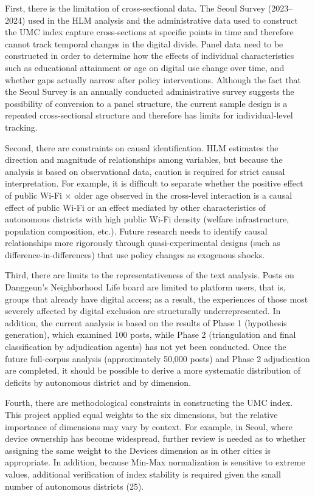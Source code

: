 First, there is the limitation of cross-sectional data. The Seoul Survey (2023--2024) used in the HLM analysis and the administrative data used to construct the UMC index capture cross-sections at specific points in time and therefore cannot track temporal changes in the digital divide. Panel data need to be constructed in order to determine how the effects of individual characteristics such as educational attainment or age on digital use change over time, and whether gaps actually narrow after policy interventions. Although the fact that the Seoul Survey is an annually conducted administrative survey suggests the possibility of conversion to a panel structure, the current sample design is a repeated cross-sectional structure and therefore has limits for individual-level tracking.

Second, there are constraints on causal identification. HLM estimates the direction and magnitude of relationships among variables, but because the analysis is based on observational data, caution is required for strict causal interpretation. For example, it is difficult to separate whether the positive effect of public Wi-Fi $\times$ older age observed in the cross-level interaction is a causal effect of public Wi-Fi or an effect mediated by other characteristics of autonomous districts with high public Wi-Fi density (welfare infrastructure, population composition, etc.). Future research needs to identify causal relationships more rigorously through quasi-experimental designs (such as difference-in-differences) that use policy changes as exogenous shocks.

Third, there are limits to the representativeness of the text analysis. Posts on Danggeun's Neighborhood Life board are limited to platform users, that is, groups that already have digital access; as a result, the experiences of those most severely affected by digital exclusion are structurally underrepresented. In addition, the current analysis is based on the results of Phase 1 (hypothesis generation), which examined 100 posts, while Phase 2 (triangulation and final classification by adjudication agents) has not yet been conducted. Once the future full-corpus analysis (approximately 50{,}000 posts) and Phase 2 adjudication are completed, it should be possible to derive a more systematic distribution of deficits by autonomous district and by dimension.

Fourth, there are methodological constraints in constructing the UMC index. This project applied equal weights to the six dimensions, but the relative importance of dimensions may vary by context. For example, in Seoul, where device ownership has become widespread, further review is needed as to whether assigning the same weight to the Devices dimension as in other cities is appropriate. In addition, because Min-Max normalization is sensitive to extreme values, additional verification of index stability is required given the small number of autonomous districts (25).

